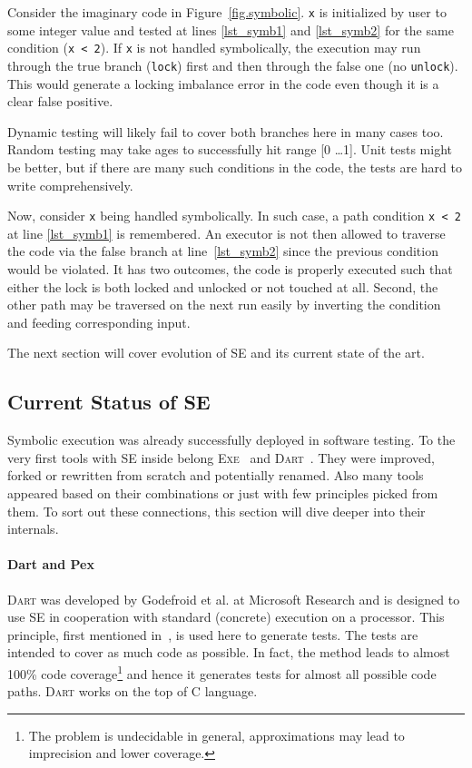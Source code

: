 \documentclass[11pt,a4paper]{article}
\begin{document}
Consider the imaginary code in Figure~\ref{fig.symbolic}. \texttt{x} is
initialized by user to some integer value and tested at lines \ref{lst_symb1}
and \ref{lst_symb2} for the same condition (\texttt{x < 2}). If \texttt{x} is
not handled symbolically, the execution may run through the true branch
(\texttt{lock}) first and then through the false one (no \texttt{unlock}).
This would generate a locking imbalance error in the code even though it is a
clear false positive.

Dynamic testing will likely fail to cover both branches here in many cases
too. Random testing may take ages to successfully hit range [0 \ldots 1]. Unit
tests might be better, but if there are many such conditions in the code,
the tests are hard to write comprehensively.

Now, consider \texttt{x} being handled symbolically. In such case, a path
condition \texttt{x < 2} at line \ref{lst_symb1} is remembered. An executor is
not then allowed to traverse the code via the false branch at
line~\ref{lst_symb2} since the previous condition would be violated. It has
two outcomes, the code is properly executed such that either the lock is both
locked and unlocked or not touched at all. Second, the other path may be
traversed on the next run easily by inverting the condition and feeding
corresponding input.

The next section will cover evolution of SE and its current state of the art.

\subsection{Current Status of SE}
Symbolic execution was already successfully deployed in software testing. To
the very first tools with SE inside belong \textsc{Exe}~\cite{exe} and
\textsc{Dart}~\cite{dart}. They were improved, forked or rewritten from
scratch and potentially renamed. Also many tools appeared based on their
combinations or just with few principles picked from them. To sort out these
connections, this section will dive deeper into their internals.

\paragraph{Dart and Pex} \textsc{Dart} was developed by Godefroid et al. at
Microsoft Research and is designed to use SE in cooperation with standard
(concrete) execution on a processor. This principle, first mentioned
in~\cite{first_symb_dyn}, is used here to generate tests. The tests are
intended to cover as much code as possible. In fact, the method leads to
almost 100\% code coverage\footnote{The problem is undecidable in general,
approximations may lead to imprecision and lower coverage.} and hence it
generates tests for almost all possible code paths. \textsc{Dart} works on the
top of C language.
\end{document}
